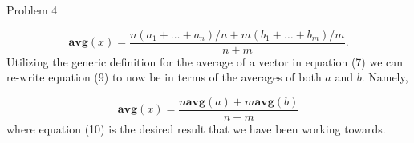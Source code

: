 \begin{problem}{Problem 4}
\begin{Highlight}
        \begin{equation}
            \mathbf{avg}(x) = \frac{n(a_{1} + \dots + a_{n})/n + m(b_{1} + \dots + b_{m})/m}{n + m}.
        \end{equation}
        Utilizing the generic definition for the average of a vector in equation (7) we can re-write equation (9) to now be in terms of the averages of both $a$ and $b$. Namely,

        \begin{equation}
            \mathbf{avg}(x) = \frac{n\mathbf{avg}(a) + m\mathbf{avg}(b)}{n + m}
        \end{equation}
        where equation (10) is the desired result that we have been working towards.
    \end{Highlight}
\end{problem}

